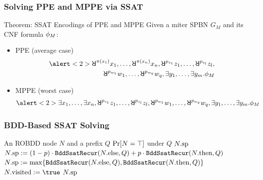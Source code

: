 \begin{frame}
  \frametitle{Solving PPE and MPPE via SSAT}
  \begin{block}{Theorem: SSAT Encodings of PPE and MPPE}
    Given a miter SPBN $G_M$ and its CNF formula $\phi_M$:
    \begin{itemize}
      \item PPE (average case)
            \abovedisplayskip=0pt
            \belowdisplayskip=0pt
            \begin{align*}
              \alert<2>{\random{\pi(x_1)}x_1,\ldots,\random{\pi(x_n)}x_n},
              \random{p_{z_1}}z_1,\ldots,\random{p_{z_l}}z_l, \\
              \random{p_{w_1}}w_1,\ldots,\random{p_{w_q}}w_q,
              \exists y_1,\ldots,\exists y_m.
              \pf_M
            \end{align*}
      \item MPPE (worst case)
            \abovedisplayskip=0pt
            \belowdisplayskip=0pt
            \begin{align*}
              \alert<2>{\exists x_1,\ldots,\exists x_n},
              \random{p_{z_1}}z_1,\ldots,\random{p_{z_l}}z_l,
              \random{p_{w_1}}w_1,\ldots,\random{p_{w_q}}w_q,
              \exists y_1,\ldots,\exists y_m.
              \pf_M
            \end{align*}
    \end{itemize}
  \end{block}
\end{frame}

\begin{frame}
  \frametitle{BDD-Based SSAT Solving}
  {
    \small
    \begin{algorithmic}[1]
      \REQUIRE An ROBDD node $N$ and a prefix $Q$
      \ENSURE $\Pr[N=\top]$ under $Q$
      \label{code:bddssat-recursive-constant-start}
      \RETURN $N.\mathrm{sp}$\label{code:bddssat-recursive-constant-end}
      \ENDIF
      \alert{\STATE $N.\mathrm{sp}:=(1-p)\cdot\texttt{BddSsatRecur}(N.\mathrm{else},Q)+p\cdot\texttt{BddSsatRecur}(N.\mathrm{then},Q)$}
      \label{code:bddssat-recursive-random}
      \ELSE
      \alert{\STATE $N.\mathrm{sp}:=\max\{\texttt{BddSsatRecur}(N.\mathrm{else},Q),\texttt{BddSsatRecur}(N.\mathrm{then},Q)\}$}
      \label{code:bddssat-recursive-exist}
      \ENDIF
      \STATE $\nodevisit{N} := \true$
      \ENDIF
      \RETURN $N.\mathrm{sp}$
    \end{algorithmic}
  }
\end{frame}


